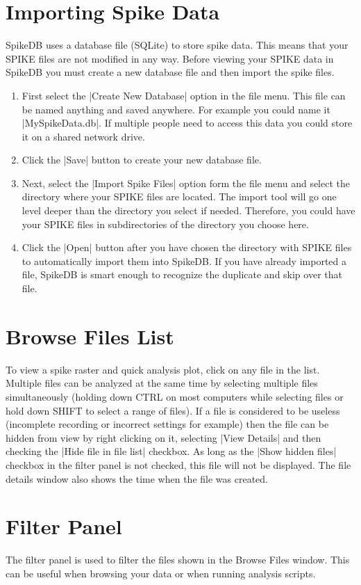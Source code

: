 \documentclass{report}
\begin{document}
\section{Importing Spike Data}
SpikeDB uses a database file (SQLite) to store spike data. This means that your SPIKE files are not modified in any way. Before viewing your SPIKE data in SpikeDB you must create a new database file and then import the spike files.
\begin{enumerate}
	\item First select the |Create New Database| option in the file menu. This file can be named anything and saved anywhere. For example you could name it |MySpikeData.db|. If multiple people need to access this data you could store it on a shared network drive.
	\item Click the |Save| button to create your new database file.
	\item  Next, select the |Import Spike Files| option form the file menu and select the directory where your SPIKE files are located. The import tool will go one level deeper than the directory you select if needed.  Therefore, you could have your SPIKE files in subdirectories of the directory you choose here.
	\item Click the |Open| button after you have chosen the directory with SPIKE files to automatically import them into SpikeDB. If you have already imported a file, SpikeDB is smart enough to recognize the duplicate and skip over that file.
\end{enumerate}


\section{Browse Files List}
To view a spike raster and quick analysis plot, click on any file in the list. Multiple files can be analyzed at the same time by selecting multiple files simultaneously (holding down CTRL on most computers while selecting files or hold down SHIFT to select a range of files). If a file is considered to be useless (incomplete recording or incorrect settings for example) then the file can be hidden from view by right clicking on it, selecting |View Details| and then checking the |Hide file in file list| checkbox.  As long as the |Show hidden files| checkbox in the filter panel is not checked, this file will not be displayed. The file details window also shows the time when the file was created.

\section{Filter Panel}
The filter panel is used to filter the files shown in the Browse Files window. This can be useful when browsing your data or when running analysis scripts.
\end{document}
